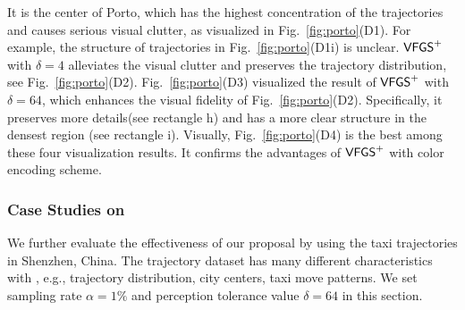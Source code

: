  It is the center of Porto, which has the highest concentration of the trajectories and causes serious visual clutter, as visualized in Fig.~\ref{fig:porto}(D1).
For example, the structure of trajectories in Fig.~\ref{fig:porto}(D1i) is unclear.
$\mathsf{VFGS}^{+}$ with $\delta=4$ alleviates the visual clutter and preserves the trajectory distribution, see Fig.~\ref{fig:porto}(D2).
Fig.~\ref{fig:porto}(D3) visualized the result of $\mathsf{VFGS}^{+}$ with $\delta=64$, which enhances the visual fidelity of Fig.~\ref{fig:porto}(D2).
Specifically, it preserves more details(see rectangle h) and has a more clear structure in the {densest} region (see rectangle i).
Visually, Fig.~\ref{fig:porto}(D4) is the best among these four visualization results.
It confirms the advantages of $\mathsf{VFGS}^{+}$ with color encoding scheme.





\subsubsection{Case Studies on \sz}\label{sec:sz}
We further evaluate the effectiveness of our proposal by using the taxi trajectories in Shenzhen, China.
The \sz{} trajectory dataset has many different characteristics with \pt{}, e.g., trajectory distribution, city centers, taxi move patterns.
We set sampling rate $\alpha=1\%$ and perception tolerance value $\delta = 64$ in this section.

